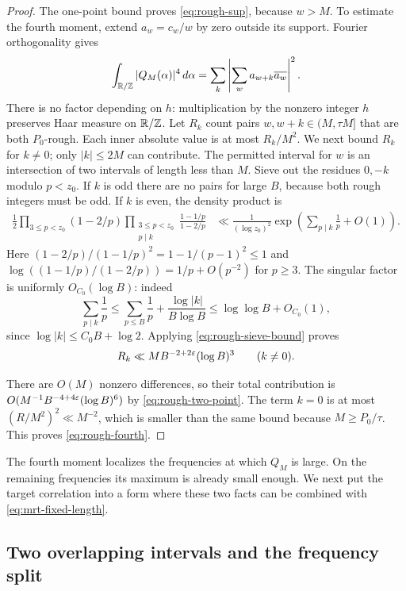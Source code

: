\begin{proof}
The one-point bound proves \eqref{eq:rough-sup}, because $w>M$.
To estimate the fourth moment, extend $a_w=c_w/w$ by zero outside its
support. Fourier orthogonality gives
\[
 \int_{\mathbb R/\mathbb Z}|Q_M(\alpha)|^4\,d\alpha
 =\sum_k\left|\sum_w a_{w+k}\overline{a_w}\right|^2.
\]
There is no factor depending on $h$: multiplication by the nonzero
integer $h$ preserves Haar measure on $\mathbb R/\mathbb Z$.
Let $R_k$ count pairs $w,w+k\in(M,\tau M]$ that are both
$P_0$-rough. Each inner absolute value is at most $R_k/M^2$.
We next bound $R_k$ for $k\ne0$; only $|k|\le2M$ can contribute.
The permitted interval for $w$ is an intersection of two intervals of
length less than $M$. Sieve out the residues $0,-k$ modulo $p<z_0$.
If $k$ is odd there are no pairs for large $B$, because both rough
integers must be odd. If $k$ is even, the density product is
\begin{align*}
 \frac12\prod_{3\le p<z_0}(1-2/p)
 \prod_{\substack{3\le p<z_0\\p\mid k}}
       \frac{1-1/p}{1-2/p}
 &\ll\frac1{(\log z_0)^2}
       \exp\left(\sum_{p\mid k}\frac1p+O(1)\right).
\end{align*}
Here $(1-2/p)/(1-1/p)^2=1-1/(p-1)^2\le1$ and
$\log((1-1/p)/(1-2/p))=1/p+O(p^{-2})$ for $p\ge3$.
The singular factor is uniformly $O_{C_0}(\log B)$: indeed
\[
 \sum_{p\mid k}\frac1p
 \le\sum_{p\le B}\frac1p+\frac{\log|k|}{B\log B}
 \le\log\log B+O_{C_0}(1),
\]
since $\log|k|\le C_0B+\log2$. Applying
\eqref{eq:rough-sieve-bound} proves
\begin{equation}\label{eq:rough-two-point}
 R_k\ll M B^{-2+2\varepsilon}(\log B)^3\qquad(k\ne0).
\end{equation}

There are $O(M)$ nonzero differences, so their total contribution is
$O(M^{-1}B^{-4+4\varepsilon}(\log B)^6)$ by
\eqref{eq:rough-two-point}. The term $k=0$ is at most
$(R/M^2)^2\ll M^{-2}$, which is smaller than the same bound because
$M\ge P_0/\tau$. This proves \eqref{eq:rough-fourth}.
\end{proof}

The fourth moment localizes the frequencies at which $Q_M$ is large.
On the remaining frequencies its maximum is already small enough.
We next put the target correlation into a form where these two facts
can be combined with \eqref{eq:mrt-fixed-length}.

\subsection{Two overlapping intervals and the frequency split}

